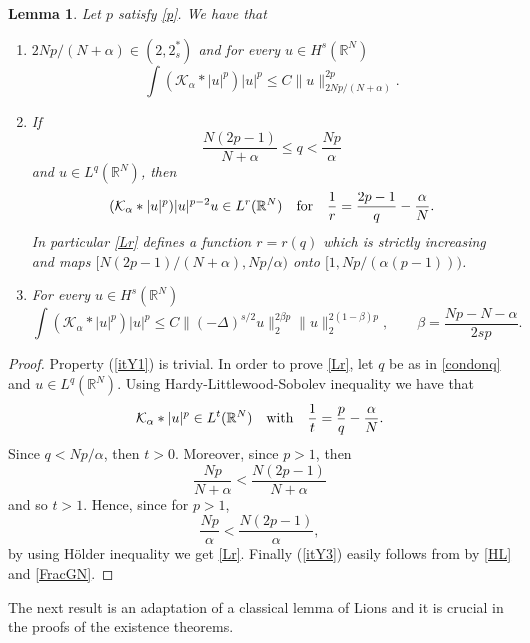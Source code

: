 \documentclass[10pt]{amsart}
\numberwithin{equation}{section}
\newtheorem{lemma}[theorem]{Lemma}
\begin{document}
\begin{lemma}\label{Young}
Let $p$ satisfy \eqref{p}. We have that
\begin{enumerate}[label=(\roman*),ref=\roman*]
\item \label{itY1} $2Np/(N+\alpha)\in (2, 2_{s}^{*})$ and for every $u\in{H^{s}(\mathbb R^{N})}$
\begin{equation}\label{HL}
\int {{(\mathcal K_{\alpha}*|u|^{p})}} |u|^{p} \leq C \|u\|_{2Np/(N+\alpha)}^{2p}.
\end{equation}
\item \label{itY2} If 
\begin{equation}
\label{condonq}
\frac{N(2p-1)}{N+\alpha}
\leq q <
\frac{Np}{\alpha}
\end{equation} 
and $u\in L^q (\mathbb{R}^N)$, then
\begin{equation}
\label{Lr}
(\mathcal{K}_{\alpha} * |u|^p)|u|^{p-2}u \in L^r(\mathbb{R}^N)
\quad
\hbox{for}
\quad
\frac{1}{r}=\frac{2p-1}{q}-\frac{\alpha}{N}.
\end{equation}
In particular \eqref{Lr} defines a function $r=r(q)$ which is strictly increasing
and maps $[N(2p-1)/(N+\alpha),Np/\alpha)$ onto $[1,Np/(\alpha(p-1)))$.

\item \label{itY3} For every $u\in {H^{s}(\mathbb R^{N})}$
\begin{equation}
\label{consfrac}
\int {{(\mathcal K_{\alpha}*|u|^{p})}} |u|^{p}  \leq C \|(-\Delta)^{s/2}u\|_{2}^{2\beta p} \|u\|_{2}^{2(1-\beta)p},
\qquad
\beta=\frac{Np-N-\alpha}{2sp}.
\end{equation}
\end{enumerate}  
\end{lemma}
\begin{proof}
Property (\ref{itY1}) is trivial. In order to prove \eqref{Lr}, let $q$ be as in \eqref{condonq} and $u\in L^q (\mathbb{R}^N)$. Using Hardy-Littlewood-Sobolev inequality we have that
\[
\mathcal{K}_{\alpha} * |u|^p\in L^t(\mathbb{R}^N)
\quad
\hbox{with}
\quad\frac{1}{t}=\frac{p}{q}-\frac{\alpha}{N}.
\]
Since $q<Np/\alpha$, then $t>0$. Moreover, since $p>1$, then 
\[
\frac{Np}{N+\alpha}<\frac{N(2p-1)}{N+\alpha}
\] 
and so $t>1$. Hence, since for $p>1$,
\[
\frac{Np}{\alpha}<\frac{N(2p-1)}{\alpha},
\]
by using H\"older inequality we get \eqref{Lr}.
Finally (\ref{itY3}) easily follows from  by \eqref{HL} and \eqref{FracGN}. 
\end{proof}
\noindent 
The next result is an adaptation of a classical lemma of Lions and it is crucial in the proofs of the existence theorems.
\end{document}
